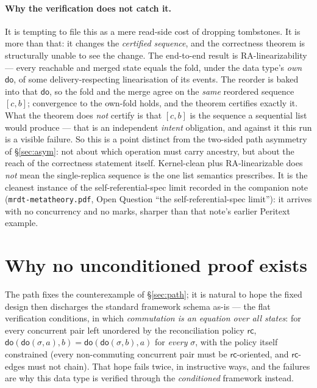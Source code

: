\documentclass[11pt]{article}
\newcommand{\rc}{\mathsf{rc}}
\newcommand{\doo}{\mathsf{do}}
\begin{document}
\paragraph{Why the verification does not catch it.} It is tempting to file this as
a mere read-side cost of dropping tombstones. It is more than that: it changes the
\emph{certified sequence}, and the correctness theorem is structurally unable to
see the change. The end-to-end result is RA-linearizability --- every reachable and
merged state equals the fold, under the data type's \emph{own} $\doo$, of some
delivery-respecting linearisation of its events. The reorder is baked into that
$\doo$, so the fold and the merge agree on the \emph{same} reordered sequence
$[c,b]$; convergence to the own-fold holds, and the theorem certifies exactly it.
What the theorem does \emph{not} certify is that $[c,b]$ is the sequence a
sequential list would produce --- that is an independent \emph{intent} obligation,
and against it this run is a visible failure. So this is a point distinct from the
two-sided path asymmetry of \S\ref{sec:asym}: not about which operation must carry
ancestry, but about the reach of the correctness statement itself. Kernel-clean
plus RA-linearizable does \emph{not} mean the single-replica sequence is the one
list semantics prescribes. It is the cleanest instance of the self-referential-spec
limit recorded in the companion note (\texttt{mrdt-metatheory.pdf}, Open Question
``the self-referential-spec limit''): it arrives with no concurrency and no marks,
sharper than that note's earlier Peritext example.

\section{Why no unconditioned proof exists}
\label{sec:uncond}

The path fixes the counterexample of \S\ref{sec:path}; it is natural to hope the
fixed design then discharges the standard framework schema as-is --- the flat
verification conditions, in which \emph{commutation is an equation over all
states}: for every concurrent pair left unordered by the reconciliation policy
$\rc$, $\doo(\doo(\sigma,a),b) = \doo(\doo(\sigma,b),a)$ for \emph{every}
$\sigma$, with the policy itself constrained (every non-commuting concurrent
pair must be $\rc$-oriented, and $\rc$-edges must not chain). That hope fails
twice, in instructive ways, and the failures are why this data type is verified
through the \emph{conditioned} framework instead.
\end{document}

